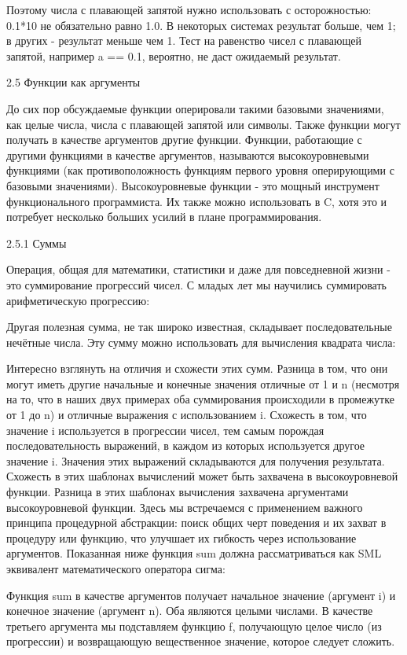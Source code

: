 Поэтому числа с плавающей запятой нужно использовать с осторожностью: 0.1*10 не обязательно равно 1.0. В некоторых системах результат больше, чем 1; в других - результат меньше чем 1. Тест на равенство чисел с плавающей запятой, например a == 0.1, вероятно, не даст ожидаемый результат.

2.5 Функции как аргументы

До сих пор обсуждаемые функции оперировали такими базовыми значениями, как целые числа, числа с плавающей запятой или символы. Также функции могут получать в качестве аргументов другие функции. Функции, работающие с другими функциями в качестве аргументов, называются высокоуровневыми функциями (как противоположность функциям первого уровня оперирующими с базовыми значениями). Высокоуровневые функции - это мощный инструмент функционального программиста. Их также можно использовать в C, хотя это и потребует несколько больших усилий в плане программирования.

2.5.1 Суммы

Операция, общая для математики, статистики и даже для повседневной жизни - это суммирование прогрессий чисел. С младых лет мы научились суммировать арифметическую прогрессию:

Другая полезная сумма, не так широко известная, складывает последовательные нечётные числа. Эту сумму можно использовать для вычисления квадрата числа:

Интересно взглянуть на отличия и схожести этих сумм. Разница в том, что они могут иметь другие начальные и конечные значения отличные от 1 и n (несмотря на то, что в наших двух примерах оба суммирования происходили в промежутке от 1 до n) и отличные выражения с использованием i. Схожесть в том, что значение i используется в прогрессии чисел, тем самым порождая последовательность выражений, в каждом из которых используется другое значение i. Значения этих выражений складываются для получения результата. Схожесть в этих шаблонах вычислений может быть захвачена в высокоуровневой функции. Разница в этих шаблонах вычисления захвачена аргументами высокоуровневой функции. Здесь мы встречаемся с применением важного принципа процедурной абстракции: поиск общих черт поведения и их захват в процедуру или функцию, что улучшает их гибкость через использование аргументов. Показанная ниже функция sum должна рассматриваться как SML эквивалент математического оператора сигма:

Функция sum в качестве аргументов получает начальное значение (аргумент i) и конечное значение (аргумент n). Оба являются целыми числами. В качестве третьего аргумента мы подставляем функцию f, получающую целое число (из прогрессии) и возвращающую вещественное значение, которое следует сложить.

